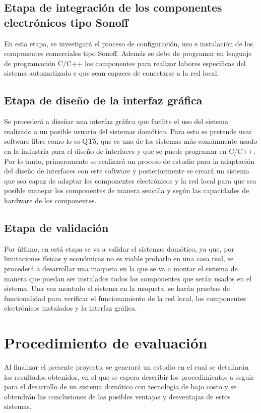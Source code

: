 \subsection{Etapa de integración de los componentes electrónicos tipo Sonoff}
En esta etapa, se investigará el proceso de configuración, uso e instalación de los componentes comerciales tipo Sonoff. Además se debe de programar en lenguaje de programación C/C++ los componentes para realizar labores específicas del sistema automatizado e que sean capaces de conectarse a la red local.

\subsection{Etapa de diseño de la interfaz gráfica}
Se procederá a diseñar una interfaz gráfica que facilite el uso del sistema realizado a un posible usuario del sistemas domótico. Para esto se pretende usar software libre como lo es QT5, que es uno de los sistemas más comúnmente usado en la industria para el diseño de interfaces y que se puede programar en C/C++. Por lo tanto, primeramente se realizará un proceso de estudio para la adaptación del diseño de interfaces con este software y posteriormente se creará un sistema que sea capaz de adaptar los componentes electrónicos y la red local para que sea posible manejar los componentes de manera sencilla y según las capacidades de hardware de los componentes.

\subsection{Etapa de validación}
Por último, en está etapa se va a validar el sistemas domótico, ya que, por limitaciones físicas y económicas no es viable probarlo en una casa real, se procederá a desarrollar una maqueta en la que se va a montar el sistema de manera que puedan ser instalados todos los componentes que serán usados en el sistema. Una vez montado el sistema en la maqueta, se harán pruebas de funcionalidad para verificar el funcionamiento de la red local, los componentes electrónicos instalados y la interfaz gráfica. 

\section{Procedimiento de evaluación}
Al finalizar el presente proyecto, se generará un estudio en el cual se detallarán los resultados obtenidos, en el que se espera describir los procedimientos a seguir para el desarrollo de un sistema domótico con tecnología de bajo costo y se obtendrán las conclusiones de las posibles ventajas y desventajas de estos sistemas. 

